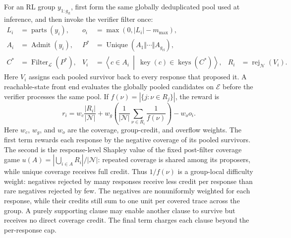 For an RL group \(y_{1:g_{\mathrm{rl}}}\), first form the same globally
deduplicated pool used at inference, and then invoke the verifier filter once:
\begin{align}
  L_i&=\operatorname{parts}(y_i),
  &o_i&=\max(0,|L_i|-m_{\max}),\nonumber\\
  A_i&=\operatorname{Admit}(y_i),
  &P^*&=\operatorname{Unique}\!\left(A_1\Vert\cdots\Vert A_{g_{\mathrm{rl}}}\right),
  \label{eq:formal-pooled-filter}\\
  C^*&=\operatorname{Filter}_{\mathcal L}(P^*),
  &V_i&=\left\langle c\in A_i\ \middle|\
    \operatorname{key}(c)\in\operatorname{keys}(C^*)\right\rangle,
  &R_i&=\operatorname{rej}_{\mathcal N}(V_i).
  \label{eq:formal-projection}
\end{align}
Here \(V_i\) assigns each pooled survivor back to every response that proposed
it.  A reachable-state front end evaluates the globally pooled candidates on
\(\mathcal E\) before the verifier processes the same pool.  If
\(f(\nu)=|\{j:\nu\in R_j\}|\), the reward is
\begin{equation}
  r_i=w_c\frac{|R_i|}{|\mathcal N|}
      +w_g\left(
        \frac{1}{|\mathcal N|}\sum_{\nu\in R_i}\frac{1}{f(\nu)}
      \right)-w_o o_i.
  \label{eq:formal-reward}
\end{equation}
Here \(w_c\), \(w_g\), and \(w_o\) are the coverage, group-credit, and overflow
weights.  The first term rewards each response by the negative coverage of
its pooled survivors.  The second is the response-level Shapley value of the
fixed post-filter coverage game
\(u(A)=|\bigcup_{i\in A}R_i|/|\mathcal N|\): repeated coverage is shared among
its proposers, while unique coverage receives full credit.  Thus
\(1/f(\nu)\) is a group-local difficulty weight: negatives rejected by many
responses receive less credit per response than rare negatives rejected by
few.  The negatives are nonuniformly weighted for each response, while their
credits still sum to one unit per covered trace across the group.  A purely
supporting clause may enable another clause to survive but receives no direct
coverage credit.  The final term charges each clause beyond the per-response
cap.

